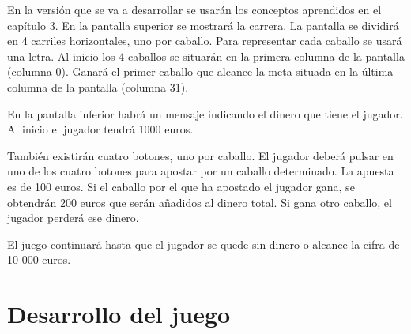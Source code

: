En la versión que se va a desarrollar se usarán los conceptos aprendidos en el capítulo 3. En la pantalla superior se mostrará la carrera. La pantalla se dividirá en 4 carriles horizontales, uno por caballo. Para representar cada caballo se usará una letra. Al inicio los 4 caballos se situarán en la primera columna de la pantalla (columna 0). Ganará el primer caballo que alcance la meta situada en la última columna de la pantalla (columna 31).

En la pantalla inferior habrá un mensaje indicando el dinero que tiene el jugador. Al inicio el jugador tendrá 1000 euros.

También existirán cuatro botones, uno por caballo. El jugador deberá pulsar en uno de los cuatro botones para apostar por un caballo determinado. La apuesta es de 100 euros. Si el caballo por el que ha apostado el jugador gana, se obtendrán 200 euros que serán añadidos al dinero total. Si gana otro caballo, el jugador perderá ese dinero.

El juego continuará hasta que el jugador se quede sin dinero o alcance la cifra de 10 000 euros.

\section{Desarrollo del juego}

